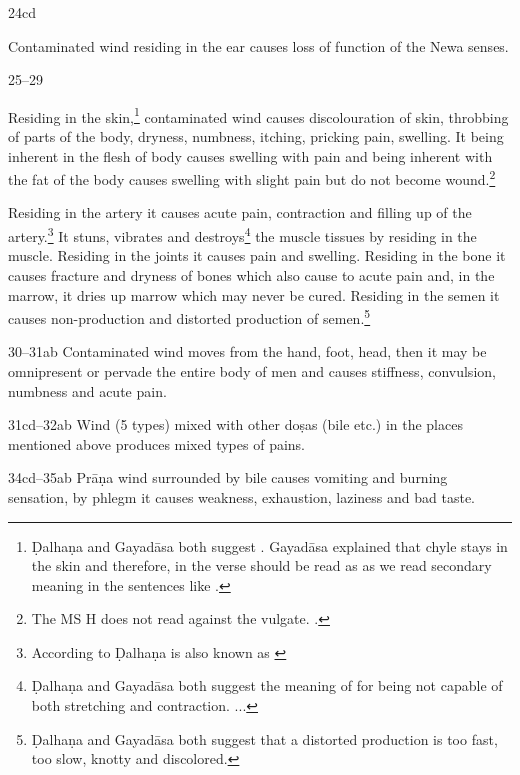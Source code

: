 \begin{translation}
\item[24cd]

Contaminated wind residing in the ear causes loss of function of 
the Newa
senses.

\item[25--29] 

Residing in the skin,\footnote{Ḍalhaṇa and Gayadāsa both suggest
    . Gayadāsa explained that chyle stays in the skin and
    therefore, in the verse  should be read as
     as we read secondary meaning in the sentences like
    .} contaminated wind causes discolouration of
    skin, throbbing of parts of the body, dryness, numbness, itching,
    pricking pain, swelling. It being inherent in the flesh of body causes
    swelling with pain and being inherent with the fat of the body causes
    swelling with slight pain but do not become wound.\footnote{The MS H
        does not read  against the vulgate. \citep[261]{vulgate}.}

Residing in the artery it causes acute pain, contraction and filling up of the 
artery.\footnote{According to Ḍalhaṇa  is also known as 
 \citep[262]{vulgate}} It stuns, vibrates and 
destroys\footnote{Ḍalhaṇa and Gayadāsa both suggest the meaning of 
 for being not capable of both stretching and contraction. 
\citep[262]{vulgate} 
...} 
the muscle tissues by residing in the muscle. Residing in the joints it causes 
pain 
and swelling. Residing in the bone it causes fracture and dryness of bones 
which 
also cause to acute pain and, in the marrow, it dries up marrow which may 
never 
be cured. Residing in the semen it causes non-production and distorted 
production of semen.\footnote{Ḍalhaṇa and Gayadāsa both suggest that a 
distorted production  is too fast, too slow, knotty and 
discolored.} 


\item[30--31ab] Contaminated wind moves from the hand, foot, head, then it 
may be omnipresent or pervade the entire body of men and causes stiffness, 
convulsion, numbness and acute pain.

\item[31cd--32ab] Wind (5 types) mixed with other doṣas (bile etc.) in the 
places mentioned above produces mixed types of pains.

\item[34cd--35ab] Prāṇa wind surrounded by bile causes vomiting and burning 
sensation, by phlegm it causes weakness, exhaustion, laziness and bad taste. 


\end{translation}
